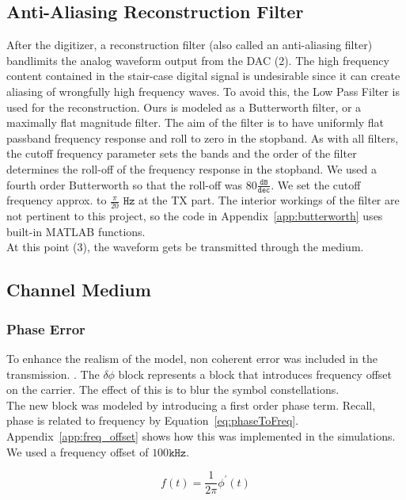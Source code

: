 \documentclass[]{article}
\begin{document}
\subsection{Anti-Aliasing Reconstruction Filter}
\label{sec:reconstruction}
After the digitizer, a reconstruction filter (also called an anti-aliasing filter) bandlimits the analog waveform output from the DAC (2).  The high frequency content contained in the stair-case digital signal is undesirable since it can create aliasing of wrongfully high frequency waves. To avoid this, the Low Pass Filter is used for the reconstruction.  Ours is modeled as a Butterworth filter, or a maximally flat magnitude filter.  The aim of the filter is to have uniformly flat passband frequency response and roll to zero in the stopband.  As with all filters, the cutoff frequency parameter sets the bands and the order of the filter determines the roll-off of the frequency response in the stopband.  We used a fourth order Butterworth so that the roll-off was $80 \mathtt{\frac{dB}{dec}}$.  We set the cutoff frequency approx. to $\frac{\pi}{20}$ $\mathtt{Hz}$ at the TX part. The interior workings of the filter are not pertinent to this project, so the code in Appendix~\ref{app:butterworth} uses built-in MATLAB functions.  \\

At this point (3), the waveform gets be transmitted through the medium.\\
\subsection{Channel Medium}
\label{sec:channel}
\subsubsection{Phase Error}
\label{sec:phaseError}
To enhance the realism of the model, non coherent error was included in the transmission.  .  The $\delta\phi$ block represents a block that introduces frequency offset on the carrier.  The effect of this is to blur the symbol constellations.  \\

The new block was modeled by introducing a first order phase term.  Recall, phase is related to frequency by Equation~\ref{eq:phaseToFreq}. Appendix~\ref{app:freq_offset} shows how this was implemented in the simulations.  We used a frequency offset of $100 \mathtt{kHz}$.  

\begin{equation}
\label{eq:phaseToFreq}
f(t) = \frac{1}{2 \pi} \phi^\prime(t)
\end{equation}
\end{document}

